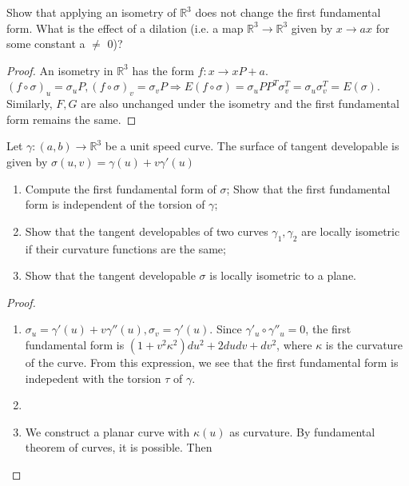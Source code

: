 \begin{problem}
Show that applying an isometry of $\mathbb{R}^3$ does not change the first fundamental form. 
What is the effect of a dilation (i.e. a map $\mathbb{R}^3 \to \mathbb{R}^3$ given by $x\to ax$
for some constant a $\neq$ 0)?
\end{problem}
\begin{solution}
\begin{proof}
An isometry in $\mathbb{R}^3$ has the form $f:x\to xP+a$. $(f\circ \sigma)_u =\sigma_u P,(f\circ \sigma)_v =\sigma_v P \Rightarrow E(f\circ\sigma) = \sigma_u PP^T\sigma_v^T =\sigma_u \sigma_v^T=E(\sigma)$. Similarly, $F,G$ are also unchanged under the isometry and the first fundamental form remains the same.
\end{proof}
\end{solution}

\begin{problem}
Let $\gamma:(a,b) \to \mathbb{R}^3$ be a unit speed curve. The surface of tangent developable is given by
$\sigma(u,v) = \gamma(u)+v\gamma'(u)$
\begin{enumerate}[label=(\arabic*)]
\item Compute the first fundamental form of $\sigma$; Show that the first fundamental form is independent of the torsion of $\gamma$;
\item Show that the tangent developables of two curves $\gamma_1,\gamma_2$ are locally isometric if their curvature functions are the same;
\item Show that the tangent developable $\sigma$ is locally isometric to a plane.
\end{enumerate}
\end{problem}
\begin{solution}
\begin{proof}\mbox{}
\begin{enumerate}[label=(\arabic*)]
\item $\sigma_u = \gamma'(u)+v\gamma''(u),\sigma_v = \gamma'(u)$. Since $\gamma'_u \circ \gamma''_u =0$, the first fundamental form is $(1+v^2\kappa^2)du^2+2dudv+dv^2$, where $\kappa$ is the curvature of the curve. From this expression, we see that the first fundamental form is indepedent with the torsion $\tau$ of $\gamma$. 
\item 
\item We construct a planar curve with $\kappa(u)$ as curvature. By fundamental theorem of curves, it is possible. Then 
\end{enumerate}
\end{proof}
\end{solution}

